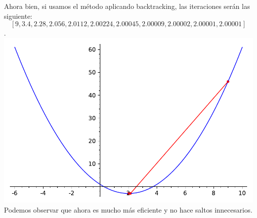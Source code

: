 \begin{example}
	Ahora bien, si usamos el método aplicando backtracking, las iteraciones serán las siguiente: $$[9,3.4,2.28,2.056,2.0112,2.00224,2.00045,2.00009,2.00002,2.00001,2.00001]$$.\\
	\includegraphics[scale=0.5]{imagenes/ejemplo1_maximodescenso.pdf}\centering \\
	Podemos observar que ahora es mucho más eficiente y no hace saltos innecesarios.
\end{example}
